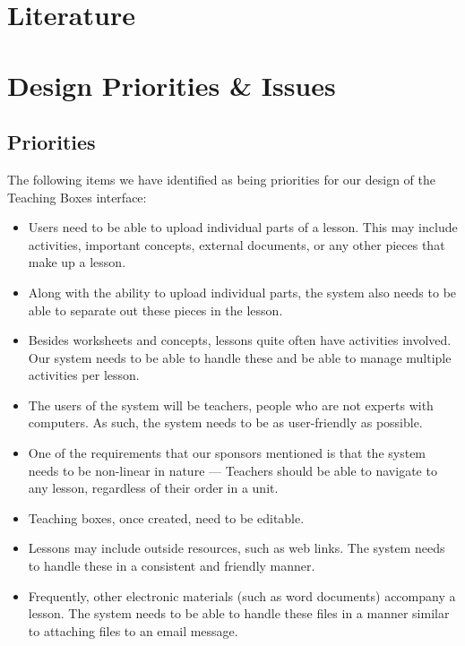\documentclass[12pt,titlepage]{article}
\begin{document}
\section{Literature}


\section{Design Priorities \& Issues}
\subsection{Priorities}

The following items we have identified as being priorities for our design of
the Teaching Boxes interface:

\begin{itemize}
\item Users need to be able to upload individual parts of a lesson.  This may
      include activities, important concepts, external documents, or any other
      pieces that make up a lesson.

\item Along with the ability to upload individual parts, the system also needs
      to be able to separate out these pieces in the lesson.

\item Besides worksheets and concepts, lessons quite often have activities
      involved.  Our system needs to be able to handle these and be able
      to manage multiple activities per lesson.

\item The users of the system will be teachers, people who are not experts
      with computers.  As such, the system needs to be as user-friendly as possible.

\item One of the requirements that our sponsors mentioned is that the system
      needs to be non-linear in nature --- Teachers should be able to navigate
      to any lesson, regardless of their order in a unit.

\item Teaching boxes, once created, need to be editable.

\item Lessons may include outside resources, such as web links.  The system
      needs to handle these in a consistent and friendly manner.

\item Frequently, other electronic materials (such as word documents) accompany
      a lesson.  The system needs to be able to handle these files in a manner
      similar to attaching files to an email message.


\end{itemize}
\end{document}
